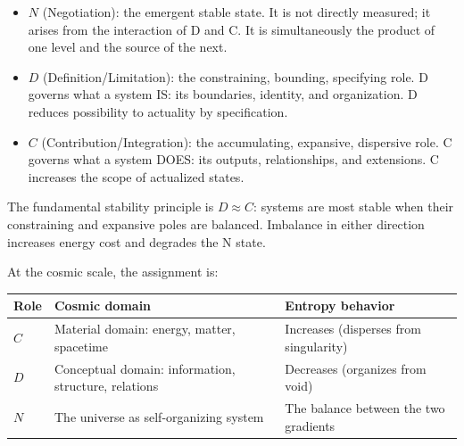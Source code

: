 \documentclass[12pt]{article}
\providecommand{\tightlist}{%
  \setlength{\itemsep}{0pt}\setlength{\parskip}{0pt}}
\begin{document}
\begin{itemize}
\tightlist
\item
  \(N\) (Negotiation): the emergent stable state. It is not directly
  measured; it arises from the interaction of D and C. It is
  simultaneously the product of one level and the source of the next.
\item
  \(D\) (Definition/Limitation): the constraining, bounding, specifying
  role. D governs what a system IS: its boundaries, identity, and
  organization. D reduces possibility to actuality by specification.
\item
  \(C\) (Contribution/Integration): the accumulating, expansive,
  dispersive role. C governs what a system DOES: its outputs,
  relationships, and extensions. C increases the scope of actualized
  states.
\end{itemize}

The fundamental stability principle is \(D \approx C\): systems are most
stable when their constraining and expansive poles are balanced.
Imbalance in either direction increases energy cost and degrades the N
state.

At the cosmic scale, the assignment is:

\begin{longtable}[]{@{}
  >{\raggedright\arraybackslash}p{}
  >{\raggedright\arraybackslash}p{}
  >{\raggedright\arraybackslash}p{}@{}}
\toprule\noalign{}
\begin{minipage}[b]{\linewidth}\raggedright
Role
\end{minipage} & \begin{minipage}[b]{\linewidth}\raggedright
Cosmic domain
\end{minipage} & \begin{minipage}[b]{\linewidth}\raggedright
Entropy behavior
\end{minipage} \\
\midrule\noalign{}
\endhead
\bottomrule\noalign{}
\endlastfoot
\(C\) & Material domain: energy, matter, spacetime & Increases
(disperses from singularity) \\
\(D\) & Conceptual domain: information, structure, relations & Decreases
(organizes from void) \\
\(N\) & The universe as self-organizing system & The balance between the
two gradients \\
\end{longtable}
\end{document}
